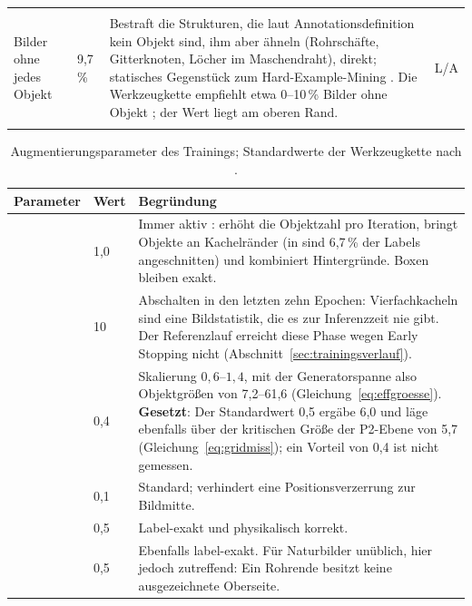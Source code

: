 {\begin{longtable}{@{}L{0.195\textwidth}L{0.065\textwidth}L{0.525\textwidth}L{0.05\textwidth}@{}}
\addlinespace
{}\\
Bilder ohne jedes Objekt & 9,7\,\% & Bestraft die Strukturen, die laut Annotationsdefinition kein Objekt sind, ihm aber ähneln (Rohrschäfte, Gitterknoten, Löcher im Maschendraht), direkt; statisches Gegenstück zum Hard-Example-Mining \parencite{shrivastava2016}. Die Werkzeugkette empfiehlt etwa 0--10\,\% Bilder ohne Objekt \parencite{ultralyticstipps}; der Wert liegt am oberen Rand. & L/A \\
\addlinespace
{}\\
\end{longtable}
}

\begin{table}[htbp]
\centering
\caption[Augmentierungsparameter zur Trainingszeit]{Augmentierungsparameter des
Trainings; Standardwerte der Werkzeugkette nach \textcite{ultralyticsdocs}.}
\label{tab:trainaug}
\footnotesize
\begin{tabularx}{\textwidth}{@{}L{0.155\textwidth}L{0.05\textwidth}X@{}}
\toprule
\textbf{Parameter} & \textbf{Wert} & \textbf{Begründung} \\
\midrule
{} & 1,0 &
Immer aktiv \parencite{bochkovskiy2020}: erhöht die Objektzahl pro Iteration,
bringt Objekte an Kachelränder (in  sind 6,7\,\% der Labels
angeschnitten) und kombiniert Hintergründe. Boxen bleiben exakt. \\
 & 10 &
Abschalten in den letzten zehn Epochen: Vierfachkacheln sind eine Bildstatistik,
die es zur Inferenzzeit nie gibt. Der Referenzlauf erreicht diese Phase wegen
Early Stopping nicht (Abschnitt~\ref{sec:trainingsverlauf}). \\
 & 0,4 &
Skalierung $0{,}6$--$1{,}4$, mit der Generatorspanne also Objektgrößen von
7,2--61,6\px{} (Gleichung~\eqref{eq:effgroesse}). \textbf{Gesetzt}: Der
Standardwert 0,5 ergäbe 6,0\px{} und läge ebenfalls über der kritischen Größe
der P2-Ebene von 5,7\px{} (Gleichung~\eqref{eq:gridmiss}); ein Vorteil von 0,4
ist nicht gemessen. \\
 & 0,1 &
Standard; verhindert eine Positionsverzerrung zur Bildmitte. \\
 & 0,5 &
Label-exakt und physikalisch korrekt. \\
 & 0,5 &
Ebenfalls label-exakt. Für Naturbilder unüblich, hier jedoch zutreffend: Ein Rohrende
besitzt keine ausgezeichnete Oberseite. \\

\end{tabularx}
\end{table}
